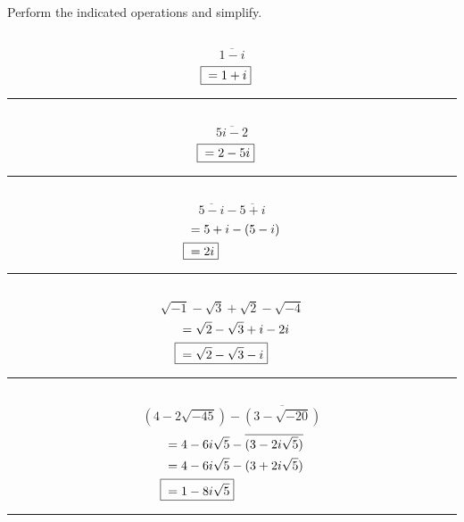 


\section{}
	Perform the indicated operations and simplify.

	\subsection{}
		\[\overline{1 - i}\]
		\begin{align*}
			\Aboxed{{} &= 1 + i}
		\end{align*}
		\hrule{}

	\subsection{}
		\[\overline{5i - 2}\]
		\begin{align*}
			\Aboxed{{} &= 2 - 5i}
		\end{align*}
		\hrule{}

	\subsection{}
		\[\overline{5 - i} - \overline{5 + i}\]
		\begin{align*}
			&= 5 + i - (5 - i) \\
			\Aboxed{{} &= 2i}
		\end{align*}
		\hrule{}

	\subsection{}
		\[\sqrt{-1} - \sqrt{3} + \sqrt{2} - \sqrt{-4}\]
		\begin{align*}
			&= \sqrt{2} - \sqrt{3} + i - 2i \\
			\Aboxed{{} &= \sqrt{2} - \sqrt{3} - i}
		\end{align*}
		\hrule{}

	\subsection{}
		\[(4 - 2\sqrt{-45}) - \overline{(3 - \sqrt{-20})}\]
		\begin{align*}
			&= 4 - 6i\sqrt{5} - \overline{(3 - 2i\sqrt{5})} \\
			&= 4 - 6i\sqrt{5} - (3 + 2i\sqrt{5}) \\
			\Aboxed{{} &= 1 - 8i\sqrt{5}}
		\end{align*}
		\hrule{}


